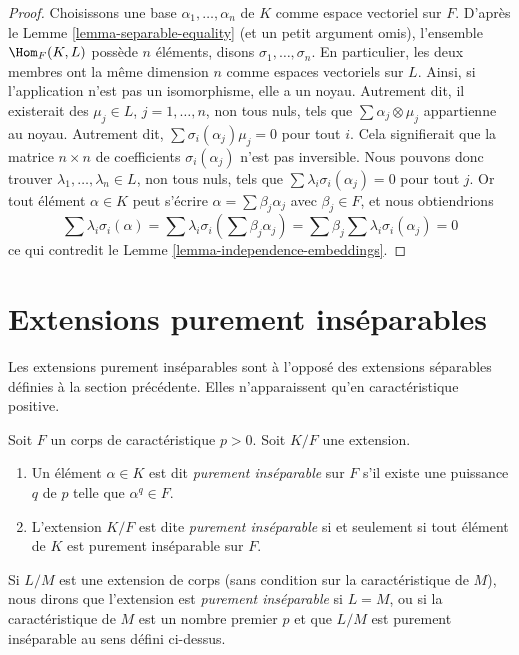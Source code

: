 \begin{proof}
Choisissons une base $\alpha_1, \ldots, \alpha_n$ de $K$ comme espace vectoriel sur $F$.
D'après le Lemme \ref{lemma-separable-equality} (et un petit argument omis), l'ensemble
$\Hom_F(K, L)$ possède $n$ éléments, disons $\sigma_1, \ldots, \sigma_n$.
En particulier, les deux membres ont la même dimension $n$ comme espaces
vectoriels sur $L$. Ainsi, si l'application n'est pas un isomorphisme, elle
a un noyau. Autrement dit, il existerait des
$\mu_j \in L$, $j = 1, \ldots, n$, non tous nuls,
tels que $\sum \alpha_j \otimes \mu_j$ appartienne au noyau.
Autrement dit, $\sum \sigma_i(\alpha_j)\mu_j = 0$ pour tout $i$.
Cela signifierait que la matrice $n \times n$ de coefficients
$\sigma_i(\alpha_j)$ n'est pas inversible. Nous pouvons donc trouver
$\lambda_1, \ldots, \lambda_n \in L$, non tous nuls,
tels que $\sum \lambda_i\sigma_i(\alpha_j) = 0$ pour tout $j$.
Or tout élément $\alpha \in K$ peut s'écrire
$\alpha = \sum \beta_j \alpha_j$ avec $\beta_j \in F$, et nous obtiendrions
$$
\sum \lambda_i\sigma_i(\alpha) =
\sum \lambda_i\sigma_i(\sum \beta_j \alpha_j) =
\sum \beta_j \sum \lambda_i\sigma_i(\alpha_j) = 0
$$
ce qui contredit le Lemme \ref{lemma-independence-embeddings}.
\end{proof}







\section{Extensions purement inséparables}
\label{section-purely-inseparable}

\noindent
Les extensions purement inséparables sont à l'opposé des extensions
séparables définies à la section précédente. Elles n'apparaissent
qu'en caractéristique positive.

\begin{definition}
\label{definition-purely-inseparable}
Soit $F$ un corps de caractéristique $p > 0$. Soit $K/F$ une extension.
\begin{enumerate}
\item Un élément $\alpha \in K$ est dit {\it purement inséparable} sur $F$
s'il existe une puissance $q$ de $p$ telle que $\alpha^q \in F$.
\item L'extension $K/F$ est dite {\it purement inséparable}
si et seulement si tout élément de $K$ est purement inséparable sur $F$.
\end{enumerate}
Si $L/M$ est une extension de corps (sans condition sur la caractéristique
de $M$), nous dirons que l'extension est {\it purement inséparable}
si $L = M$, ou si la caractéristique de $M$ est un nombre premier $p$
et que $L/M$ est purement inséparable au sens défini ci-dessus.
\end{definition}

